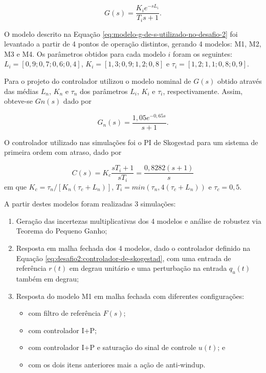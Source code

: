 \begin{equation}
    \label{eq:modelo-g-de-s-utilizado-no-desafio-2}
    G(s) = \frac{K_{i}e^{-sL_{i}}}{T_{i}s + 1}.
\end{equation}

O modelo descrito na Equação \ref{eq:modelo-g-de-s-utilizado-no-desafio-2} foi
levantado a partir de 4 pontos de operação distintos, gerando 4 modelos: M1, M2,
M3 e M4. Os parâmetros obtidos para cada modelo $i$ foram os seguintes: $L_{i} =
[0,9; 0,7; 0,6; 0,4]$, $K_{i} = [1,3; 0,9; 1,2; 0,8]$ e $\tau_{i} = [1,2; 1,1;
0,8; 0,9]$.

Para o projeto do controlador utilizou o modelo nominal de $G(s)$ obtido
através das médias $L_{n}$, $K_{n}$ e $\tau_{n}$ dos parâmetros $L_{i}$, $K_{i}$
e $\tau_{i}$, respectivamente. Assim, obteve-se $G{n}(s)$ dado por

\begin{equation}
    \label{eq:modelo-gn-de-s-utilizado-no-desafio-2}
    G_{n}(s) = \frac{1,05e^{-0,65s}}{s + 1}.
\end{equation}

O controlador utilizado nas simulações foi o PI de Skogestad para um sistema de
primeira ordem com atraso, dado por

\begin{equation}
    \label{eq:desafio2:controlador-de-skogestad}
    C(s) = K_{c}\frac{sT_{i} + 1}{sT_{i}} = \frac{0,8282(s + 1)}{s}
\end{equation}
em que $K_{c} = \tau_{n}/[K_{n}(\tau_{c} + L_{n})]$, $T_{i} = min(\tau_{n},
4(\tau_{c} + L_{n}))$ e $\tau_{c} = 0,5$. 

A partir destes modelos foram realizadas 3 simulações:
\begin{enumerate}
    \item Geração das incertezas multiplicativas dos 4 modelos e análise de
    robustez via Teorema do Pequeno Ganho;
    \item Resposta em malha fechada dos 4 modelos, dado o controlador definido
    na Equação \ref{eq:desafio2:controlador-de-skogestad}, com uma entrada de
    referência $r(t)$ em degrau unitário e uma perturbação na entrada $q_{u}(t)$
    também em degrau;
    \item Resposta do modelo M1 em malha fechada com diferentes configurações:
        \begin{itemize}
            \item com filtro de referência $F(s)$;
            \item com controlador I+P;
            \item com controlador I+P e saturação do sinal de controle $u(t)$; e
            \item com os dois itens anteriores mais a ação de anti-windup.
        \end{itemize}
\end{enumerate}

